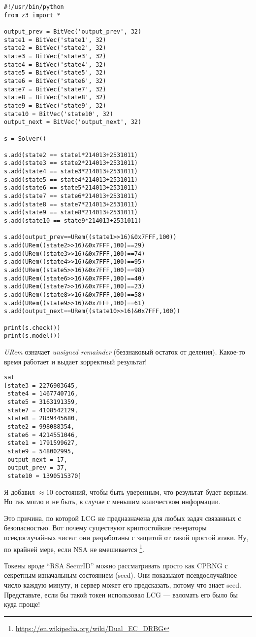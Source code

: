 \begin{lstlisting}
#!/usr/bin/python
from z3 import *

output_prev = BitVec('output_prev', 32)
state1 = BitVec('state1', 32)
state2 = BitVec('state2', 32)
state3 = BitVec('state3', 32)
state4 = BitVec('state4', 32)
state5 = BitVec('state5', 32)
state6 = BitVec('state6', 32)
state7 = BitVec('state7', 32)
state8 = BitVec('state8', 32)
state9 = BitVec('state9', 32)
state10 = BitVec('state10', 32)
output_next = BitVec('output_next', 32)

s = Solver()

s.add(state2 == state1*214013+2531011)
s.add(state3 == state2*214013+2531011)
s.add(state4 == state3*214013+2531011)
s.add(state5 == state4*214013+2531011)
s.add(state6 == state5*214013+2531011)
s.add(state7 == state6*214013+2531011)
s.add(state8 == state7*214013+2531011)
s.add(state9 == state8*214013+2531011)
s.add(state10 == state9*214013+2531011)

s.add(output_prev==URem((state1>>16)&0x7FFF,100))
s.add(URem((state2>>16)&0x7FFF,100)==29)
s.add(URem((state3>>16)&0x7FFF,100)==74)
s.add(URem((state4>>16)&0x7FFF,100)==95)
s.add(URem((state5>>16)&0x7FFF,100)==98)
s.add(URem((state6>>16)&0x7FFF,100)==40)
s.add(URem((state7>>16)&0x7FFF,100)==23)
s.add(URem((state8>>16)&0x7FFF,100)==58)
s.add(URem((state9>>16)&0x7FFF,100)==61)
s.add(output_next==URem((state10>>16)&0x7FFF,100))

print(s.check())
print(s.model())
\end{lstlisting}

\textit{URem} означает \textit{unsigned remainder} (беззнаковый остаток от деления).
Какое-то время работает и выдает корректный результат!

\begin{lstlisting}
sat
[state3 = 2276903645,
 state4 = 1467740716,
 state5 = 3163191359,
 state7 = 4108542129,
 state8 = 2839445680,
 state2 = 998088354,
 state6 = 4214551046,
 state1 = 1791599627,
 state9 = 548002995,
 output_next = 17,
 output_prev = 37,
 state10 = 1390515370]
\end{lstlisting}

Я добавил $\approx 10$ состояний, чтобы быть уверенным, что результат будет верным.
Но так могло и не быть, в случае с меньшим количеством информации.

Это причина, по которой \ac{LCG} не предназначена для любых задач связанных с безопасностью.
Вот почему существуют криптостойкие генераторы псевдослучайных чисел:
они разработаны с защитой от такой простой атаки.
Ну, по крайней мере, если \ac{NSA} не вмешивается
\footnote{\url{https://en.wikipedia.org/wiki/Dual_EC_DRBG}}.

Токены вроде ``RSA SecurID'' можно рассматривать просто как \ac{CPRNG} с секретным изначальным состоянием (seed).
Они показыают псевдослучайное число каждую минуту, и сервер может его предсказать, потому что знает seed.
Представьте, если бы такой токен использовал \ac{LCG} --- взломать его было бы куда проще!


